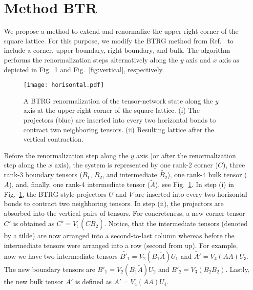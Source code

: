 \documentclass[showpacs,amssymb,twocolumn,floatfix,aps,pre,notitlepage]{revtex4-2}
\begin{document}
\section{Method BTR}\label{BTR}
%
We propose a method to extend and renormalize the upper-right corner of the square lattice.
%
For this purpose, we modify the BTRG method from Ref.~\cite{iino2019} to include a corner, upper boundary, right boundary, and bulk.
%
The algorithm performs the renormalization steps alternatively along the $y$ axis and $x$ axis as depicted in Fig.~\ref{fig:horisontal} and Fig.~\ref{fig:vertical}, respectively. 
%
\begin{figure}[htb]
\begin{center}
\texttt{[image: horisontal.pdf]}
\caption{
%
A BTRG renormalization of the tensor-network state along the $y$ axis at the upper-right corner of the square lattice.
%
(i) The projectors (blue) are inserted into every two horizontal bonds to contract two neighboring tensors.
%
(ii) Resulting lattice after the vertical contraction. 
%
}
\label{fig:horisontal}
\end{center}
\end{figure}
%
Before the renormalization step along the $y$ axis (or after the renormalization step along the $x$ axis), the system is represented by one rank-2 corner ($C$), three rank-3 boundary tensors ($B_1$, $B_2$, and intermediate $\tilde{B_2}$), one rank-4 bulk tensor ($A$), and, finally, one rank-4 intermediate tensor ($\tilde{A}$), see Fig.~\ref{fig:horisontal}. 
%
In step (i) in Fig.~\ref{fig:horisontal}, the BTRG-style projectors $U$ and $V$ are inserted into every two horizontal bonds to contract two neighboring tensors.
%
In step (ii), the projectors are absorbed into the vertical pairs of tensors.
%
For concreteness, a new corner tensor $C'$ is obtained as $C' = V_1 (C\tilde{B_2})$. 
%
Notice, that the intermediate tensors (denoted by a tilde) are now arranged into a second-to-last column whereas before the intermediate tensors were arranged into a row (second from up). 
%
For example, now we have two intermediate tensors $\tilde{{B'}_{1}} = V_2 (B_1 \tilde{A}) U_1$ and $\tilde{A'} = V_4 (A A) U_3$.
%
The new boundary tensors are ${B'}_1 = V_2 (B_1 \tilde{A}) U_2$ and ${B'}_2 = V_3 (B_2 B_2)$.
%
Lastly, the new bulk tensor $A'$ is defined as $A' = V_4 (A A) U_4$. 
%
\end{document}
